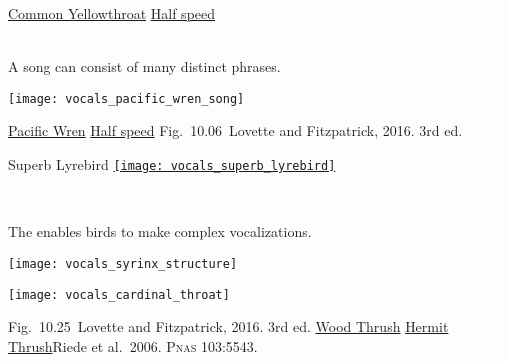 \documentclass[t]{beamer}
\newcommand{\cornell}[1]{Fig.~#1~Lovette and Fitzpatrick, 2016. 3rd ed.}
\newcommand{\backskip}{\vspace{-0.5\baselineskip}}
\begin{document}

{
\begin{frame}[b,plain]


	\tiny \href{https://youtu.be/alpYJ6M7XYk}{Common Yellowthroat} \quad \href{https://youtu.be/6dj6rBncpkY}{Half speed} \textcolor{white}{\cornell{10.05}} 
\end{frame}
}


\begin{frame}{A song can consist of many distinct phrases.}
\centering

\texttt{[image: vocals\_pacific\_wren\_song]}

\vfilll

\tiny \href{https://youtu.be/xHymewtefgk}{Pacific Wren} \quad \href{https://youtu.be/lUpax9rI3-s}{Half speed}
\hfill \cornell{10.06}
\end{frame}


{
\begin{frame}{Superb Lyrebird}
\href{https://www.youtube.com/watch?v=VjE0Kdfos4Y}{%
\texttt{[image: vocals\_superb\_lyrebird]}}

\vfilll

\tinyfill \textcolor{white}{Superb Lyrebird by Alex Maisey}
\end{frame}
}

\begin{frame}{The  enables birds to make complex vocalizations.}

\backskip

\begin{multicols}{2}

\centering
\noindent \texttt{[image: vocals\_syrinx\_structure]}

\columnbreak

\texttt{[image: vocals\_cardinal\_throat]}

\end{multicols}

\vfilll

\tiny \cornell{10.25} \hfill \href{https://academy.allaboutbirds.org/wood-thrush-singing/}{Wood Thrush} \hfill \href{https://www.youtube.com/watch?v=o0mATRdzZSc}{Hermit Thrush}\hfill Riede et al.~2006. P\textsc{nas} 103:5543.
\end{frame}
\end{document}
